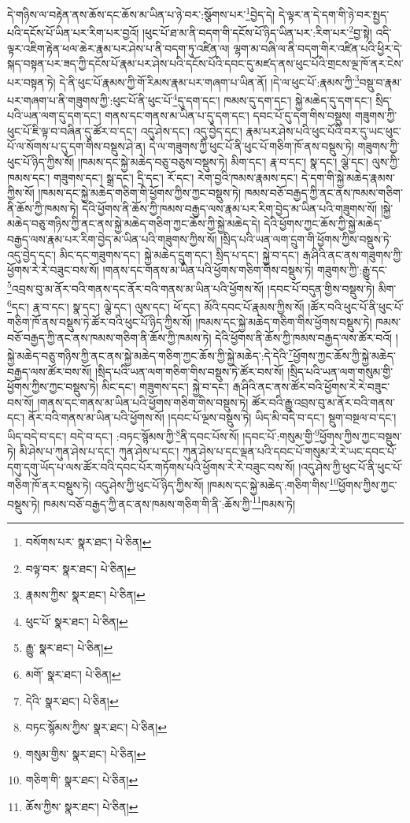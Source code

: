 དེ་གཉིས་ལ་བརྟེན་ནས་ཆོས་དང་ཆོས་མ་ཡིན་པ་ཉེ་བར་:སྩོགས་པར་\footnote{བསོགས་པར་  སྣར་ཐང་།  པེ་ཅིན། }བྱེད་དེ། དེ་ལྟར་ན་དེ་དག་གི་ཉེ་བར་སྤྱད་པའི་དངོས་པོ་ཡིན་པར་རིག་པར་བྱའོ། །ཕུང་པོ་ཐ་མ་ནི་བདག་གི་དངོས་པོ་ཉིད་ཡིན་པར་:རིག་པར་\footnote{བལྟ་བར་  སྣར་ཐང་།  པེ་ཅིན། }བྱ་སྟེ། འདི་ལྟར་འཇིག་རྟེན་ཕལ་ཆེར་རྣམ་པར་ཤེས་པ་ནི་བདག་ཏུ་འཛིན་ལ། ལྷག་མ་བཞི་ལ་ནི་བདག་གིར་འཛིན་པའི་ཕྱིར་དེ་སྐད་བསྟན་པར་ཟད་ཀྱི་དངོས་པོ་རྣམ་པར་ཤེས་པའི་དངོས་པོའི་དབང་དུ་མཛད་ནས་ཕུང་པོའི་གྲངས་ལྔ་ཁོ་ནར་ངེས་པར་བསྟན་ཏེ། དེ་ནི་ཕུང་པོ་རྣམས་ཀྱི་གོ་རིམས་རྣམ་པར་གཞག་པ་ཡིན་ནོ། །དེ་ལ་ཕུང་པོ་:རྣམས་ཀྱི་\footnote{རྣམས་ཀྱིས་  སྣར་ཐང་།  པེ་ཅིན། }བསྡུ་བ་རྣམ་པར་གཞག་པ་ནི་གཟུགས་ཀྱི་:ཕུང་པོ་ནི་ཕུང་པོ་\footnote{ཕུང་པོ་  སྣར་ཐང་།  པེ་ཅིན། }དུ་དག་དང་། ཁམས་དུ་དག་དང་། སྐྱེ་མཆེད་དུ་དག་དང་། སྲིད་པའི་ཡན་ལག་དུ་དག་དང་། གནས་དང་གནས་མ་ཡིན་པ་དུ་དག་དང་། དབང་པོ་དུ་དག་གིས་བསྡུས། གཟུགས་ཀྱི་ཕུང་པོ་ཇི་ལྟ་བ་བཞིན་དུ་ཚོར་བ་དང་། འདུ་ཤེས་དང་། འདུ་བྱེད་དང་། རྣམ་པར་ཤེས་པའི་ཕུང་པོའི་བར་དུ་ཡང་ཕུང་པོ་ལ་སོགས་པ་དུ་དག་གིས་བསྡུས་ཤེ་ན། དེ་ལ་གཟུགས་ཀྱི་ཕུང་པོ་ནི་ཕུང་པོ་གཅིག་ཁོ་ནས་བསྡུས་ཏེ། གཟུགས་ཀྱི་ཕུང་པོ་ཉིད་ཀྱིས་སོ། །ཁམས་དང་སྐྱེ་མཆེད་བཅུ་བཅུས་བསྡུས་ཏེ། མིག་དང་། རྣ་བ་དང་། སྣ་དང་། ལྕེ་དང་། ལུས་ཀྱི་ཁམས་དང་། གཟུགས་དང་། སྒྲ་དང་། དྲི་དང་། རོ་དང་། རེག་བྱའི་ཁམས་རྣམས་དང་། དེ་དག་གི་སྐྱེ་མཆེད་རྣམས་ཀྱིས་སོ། །ཁམས་དང་སྐྱེ་མཆེད་གཅིག་གི་ཕྱོགས་ཀྱིས་ཀྱང་བསྡུས་ཏེ། ཁམས་བཅོ་བརྒྱད་ཀྱི་ནང་ནས་ཁམས་གཅིག་ནི་ཆོས་ཀྱི་ཁམས་ཏེ། དེའི་ཕྱོགས་ནི་ཆོས་ཀྱི་ཁམས་བརྒྱད་ལས་རྣམ་པར་རིག་བྱེད་མ་ཡིན་པའི་གཟུགས་སོ། །སྐྱེ་མཆེད་བཅུ་གཉིས་ཀྱི་ནང་ནས་སྐྱེ་མཆེད་གཅིག་ཀྱང་ཆོས་ཀྱི་སྐྱེ་མཆེད་དེ། དེའི་ཕྱོགས་ཀྱང་ཆོས་ཀྱི་སྐྱེ་མཆེད་བརྒྱད་ལས་རྣམ་པར་རིག་བྱེད་མ་ཡིན་པའི་གཟུགས་ཀྱིས་སོ། །སྲིད་པའི་ཡན་ལག་དྲུག་གི་ཕྱོགས་ཀྱིས་བསྡུས་ཏེ་འདུ་བྱེད་དང་། མིང་དང་གཟུགས་དང་། སྐྱེ་མཆེད་དྲུག་དང་། སྲིད་པ་དང་། སྐྱེ་བ་དང་། རྒ་ཤིའི་ནང་ནས་གཟུགས་ཀྱི་ཕྱོགས་རེ་རེ་བཟུང་བས་སོ། །གནས་དང་གནས་མ་ཡིན་པའི་ཕྱོགས་གཅིག་གིས་བསྡུས་ཏེ། གཟུགས་ཀྱི་:རྒྱུ་དང་\footnote{རྒྱུ་  སྣར་ཐང་།  པེ་ཅིན། }འབྲས་བུ་མ་ནོར་བའི་གནས་དང་ནོར་བའི་གནས་མ་ཡིན་པའི་ཕྱོགས་སོ། །དབང་པོ་བདུན་གྱིས་བསྡུས་ཏེ། མིག་\footnote{མགོ་  སྣར་ཐང་།  པེ་ཅིན། }དང་། རྣ་བ་དང་། སྣ་དང་། ལྕེ་དང་། ལུས་དང་། ཕོ་དང་། མོའི་དབང་པོ་རྣམས་ཀྱིས་སོ། །ཚོར་བའི་ཕུང་པོ་ནི་ཕུང་པོ་གཅིག་ཁོ་ནས་བསྡུས་ཏེ་ཚོར་བའི་ཕུང་པོ་ཉིད་ཀྱིས་སོ། །ཁམས་དང་སྐྱེ་མཆེད་གཅིག་གིས་ཕྱོགས་བསྡུས་ཏེ། ཁམས་བཅོ་བརྒྱད་ཀྱི་ནང་ནས་ཁམས་གཅིག་ནི་ཆོས་ཀྱི་ཁམས་ཏེ། དེའི་ཕྱོགས་ནི་ཆོས་ཀྱི་ཁམས་བརྒྱད་ལས་ཚོར་བའོ། །སྐྱེ་མཆེད་བཅུ་གཉིས་ཀྱི་ནང་ནས་སྐྱེ་མཆེད་གཅིག་ཀྱང་ཆོས་ཀྱི་སྐྱེ་མཆེད་:དེ་དེའི་\footnote{དེའི་  སྣར་ཐང་།  པེ་ཅིན། }ཕྱོགས་ཀྱང་ཆོས་ཀྱི་སྐྱེ་མཆེད་བརྒྱད་ལས་ཚོར་བས་སོ། །སྲིད་པའི་ཡན་ལག་གཅིག་གིས་བསྡུས་ཏེ་ཚོར་བས་སོ། །སྲིད་པའི་ཡན་ལག་གསུམ་གྱི་ཕྱོགས་ཀྱིས་ཀྱང་བསྡུས་ཏེ། མིང་དང་། གཟུགས་དང་། སྐྱེ་བ་དང་། རྒ་ཤིའི་ནང་ནས་ཚོར་བའི་ཕྱོགས་རེ་རེ་བཟུང་བས་སོ། །གནས་དང་གནས་མ་ཡིན་པའི་ཕྱོགས་གཅིག་གིས་བསྡུས་ཏེ། ཚོར་བའི་རྒྱུ་འབྲས་བུ་མ་ནོར་བའི་གནས་དང་། ནོར་བའི་གནས་མ་ཡིན་པའི་ཕྱོགས་སོ། །དབང་པོ་ལྔས་བསྡུས་ཏེ། ཡིད་མི་བདེ་བ་དང་། སྡུག་བསྔལ་བ་དང་། ཡིད་བདེ་བ་དང་། བདེ་བ་དང་། :བཏང་སྙོམས་ཀྱི་\footnote{བཏང་སྙོམས་ཀྱིས་  སྣར་ཐང་།  པེ་ཅིན། }ནི་དབང་པོས་སོ། །དབང་པོ་:གསུམ་གྱི་\footnote{གསུམ་གྱིས་  སྣར་ཐང་།  པེ་ཅིན། }ཕྱོགས་ཀྱིས་ཀྱང་བསྡུས་ཏེ། མི་ཤེས་པ་ཀུན་ཤེས་པ་དང་། ཀུན་ཤེས་པ་དང་། ཀུན་ཤེས་པ་དང་ལྡན་པའི་དབང་པོ་གསུམ་རེ་རེ་ཡང་དབང་པོ་དགུ་དགུ་ཡོད་པ་ལས་ཚོར་བའི་དབང་པོར་གཏོགས་པའི་ཕྱོགས་རེ་རེ་བཟུང་བས་སོ། །འདུ་ཤེས་ཀྱི་ཕུང་པོ་ནི་ཕུང་པོ་གཅིག་ཁོ་ནར་བསྡུས་ཏེ། འདུ་ཤེས་ཀྱི་ཕུང་པོ་ཉིད་ཀྱིས་སོ། །ཁམས་དང་སྐྱེ་མཆེད་:གཅིག་གིས་\footnote{གཅིག་གི་  སྣར་ཐང་།  པེ་ཅིན། }ཕྱོགས་ཀྱིས་ཀྱང་བསྡུས་ཏེ། ཁམས་བཅོ་བརྒྱད་ཀྱི་ནང་ནས་ཁམས་གཅིག་གི་ནི་:ཆོས་ཀྱི་\footnote{ཆོས་ཀྱིས་  སྣར་ཐང་།  པེ་ཅིན། }ཁམས་ཏེ། 